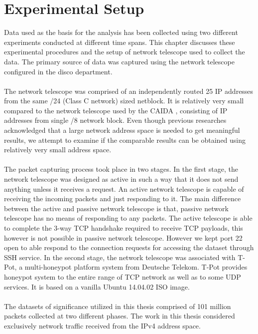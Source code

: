 \chapter{Experimental Setup}
Data used as the basis for the analysis has been collected using two different experiments conducted at different time spans.
This chapter discusses these experimental procedures and the setup of network telescope used to collect the data.
The primary source of data was captured using the network telescope configured in the
disco department.\\\\
The network telescope was comprised of an independently routed 25 IP addresses from the same /24 (Class C network) sized netblock.
It is relatively very small compared to the network telescope used by the CAIDA \cite{caida}, consisting of IP addresses from single /8 network block.
Even though previous researches \cite{pang2004characteristics}\cite{wustrow2010internet} acknowledged that a large network address space is needed to get meaningful results, we attempt to examine if the comparable results can be obtained using relatively very small address space.\\\\
The packet capturing process took place in two stages. 
In the first stage, the network telescope was designed as active in such a way that it does not send anything unless it receives a request.
An active network telescope is capable of receiving the incoming packets and just responding to it.
The main difference between the active and passive network telescope is that, passive network telescope has no means of responding to any packets.
The active telescope is able to complete the 3-way TCP handshake required to receive TCP payloads, this however is not possible in passive network telescope.
However we kept port 22 open to able respond to the connection requests for accessing the dataset through SSH service.
In the second stage, the network telescope was associated with T-Pot, a multi-honeypot platform system from Deutsche Telekom.
T-Pot provides honeypot system to the entire range of TCP network as well as to some UDP services.
It is based on a vanilla Ubuntu 14.04.02 ISO image.\\\\
The datasets of significance utilized in this thesis comprised of 101 million packets
collected at two different phases.
The work in this thesis considered exclusively network traffic received from the IPv4 address space.\\\\
